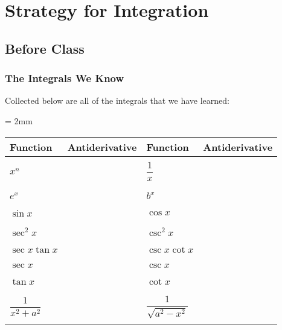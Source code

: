 \documentclass[notes]{subfiles}
\begin{document}
	\fancyhead[LO,RE]{\bfseries \small \currentname}
	\fancyfoot[C]{{}}
	\fancyfoot[RO,LE]{\large \thepage}	%
	
\section*{Strategy for Integration}\label{cs75}
	\subsection*{Before Class}
	\subsubsection*{The Integrals We Know}
		Collected below are all of the integrals that we have learned:
		\begin{center}
			\tabulinesep = 2mm
			\begin{tabu}to .95\textwidth {|X[.75,c] | X[c] || X[.75,c] | X[c]|} \hline
				\textbf{Function}	& \textbf{Antiderivative} & \textbf{Function} & \textbf{Antiderivative}\\ \hline	
						& & & \\
				$x^n$	& & $ \dfrac{1}{x}$& \\ 
						& & & \\ \hline
						& & & \\
				$e^x$	& & $b^x$&\\ 
						& & & \\ \hline
						& & & \\
				$\sin x$	& & $\cos x$ &\\ 
						& & & \\ \hline
						& & & \\
				$\sec^2x$	& & $\csc^2x$ &\\ 
						& & & \\ \hline
						& & & \\
				$\sec x\tan x$	& & $\csc x\cot x$ &\\ 
						& & & \\ \hline
						& & & \\
				$\sec x$	& & $\csc x$ & \\ 
						& & & \\ \hline
						& & & \\
				$\tan x$	& & $\cot x$ & \\ 
						& & & \\ \hline
						& & & \\
				$\dfrac{1}{x^2 + a^2}$	& & $\dfrac{1}{\sqrt{a^2-x^2}}$ & \\ 
						& & & \\ \hline
				
			\end{tabu}
		\end{center}
			\newpage
			
\end{document}
